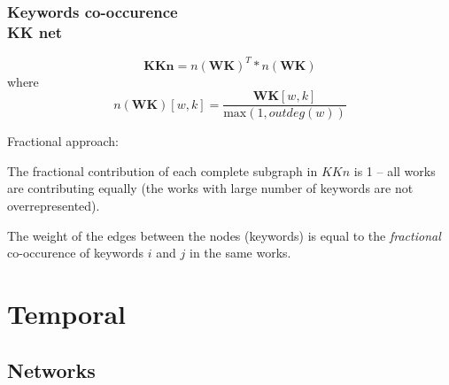 \documentclass[hyperref={pdfstartview={FitBH -32768},
                         pdfpagemode=FullScreen,
                         plainpages=false,
                         colorlinks=true}
              ]{beamer}
\begin{document}
\begin{frame}[fragile]
\frametitle{Keywords co-occurence \\ \normalsize KK net}
\small 

\[ \mathbf{KKn} = n(\mathbf{WK})^T * n(\mathbf{WK}) \]
where 
\[ n(\mathbf{WK})[w,k] = \frac {\mathbf{WK}[w,k]}{\textrm{max}(1,outdeg(w))}\]
\medskip

\medskip 
\small
Fractional approach:\smallskip 

The fractional contribution of each complete subgraph in $KKn$ is 1 -- all works are contributing equally (the works with large number of keywords are not overrepresented). 

The weight of the edges between the nodes (keywords) is equal to the \textit{fractional} co-occurence of keywords $i$ and $j$ in the same works.

\end{frame}


\section{Temporal}  
\subsection{Networks}
\end{document}
